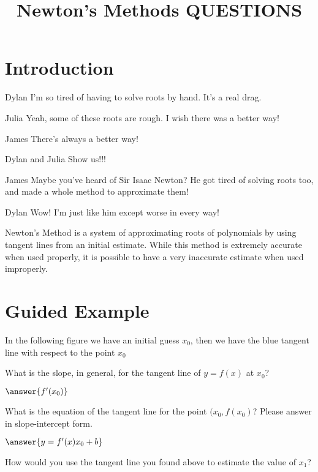 \documentclass{ximera}
\title{Newton's Methods QUESTIONS}
\begin{document}
\maketitle
\section{Introduction}
\begin{dialogue}
\item[Dylan] I'm so tired of having to solve roots by hand. It's a real drag.
\item[Julia] Yeah, some of these roots are rough. I wish there was a better way!
\item[James] There's always a better way!
\item[Dylan and Julia] Show us!!!
\item[James] Maybe you've heard of Sir Isaac Newton? He got tired of solving roots too, and made a whole method to approximate them!
\item[Dylan] Wow! I'm just like him except worse in every way!
\end{dialogue}
Newton's Method is a system of approximating roots of polynomials by using tangent lines from an initial estimate. While this method is extremely accurate when used properly, it is possible to have a very inaccurate estimate when used improperly.
\section{Guided Example}
In the following figure we have an initial guess $x_{0}$, then we have the blue tangent line with respect to the point $x_{0}$

\begin{question}
What is the slope, in general, for the tangent line of $y=f(x)$ at $x_{0}$?

$\answer{f'(x_0)}$

What is the equation of the tangent line for the point $(x_{0},f(x_{0})$? Please answer in slope-intercept form.

$\answer{y = f'(x)x_0+b}$

How would you use the tangent line you found above to estimate the value of $x_{1}$?

\begin{freeResponse}
\end{freeResponse}

\end{question}
\end{document}
